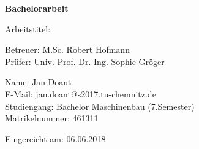 \begin{titlepage}
		\begin{center}	
		
		\vspace{1.5cm}
		
		{\huge\textbf{Bachelorarbeit}}
		
		\vspace{1.5cm}
		
		{\large Arbeitstitel:}\\
		{\large\textbf{\mytitle}}
		
		\vspace{1.5cm}
		
		Betreuer: M.Sc. Robert Hofmann\\
		Prüfer: Univ.-Prof. Dr.-Ing. Sophie Gröger		
		
		\vfill
		
			
		
	\end{center}
	
	\begin{flushleft}
		Name: Jan Doant\\		
		E-Mail: jan.doant@s2017.tu-chemnitz.de\\
		Studiengang: Bachelor Maschinenbau (7.Semester)\\
		Matrikelnummer: 461311\linebreak
		
		
		Eingereicht am: 06.06.2018
		
	\end{flushleft}
	
	
\end{titlepage}